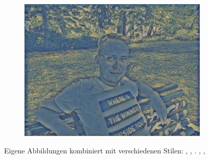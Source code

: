 \begin{figure}[H]
\begin{subfigure}[h]{0.13\textwidth}
        \includegraphics[width=\textwidth]{resources/content/experiments/ich-vgg16_the_olive_trees.jpg}
    \end{subfigure}

    \caption{Eigene Abbildungen kombiniert mit verschiedenen Stilen: \cite{crystal_glass_on_a_colorful_background_img}, \cite{portrait_of_joseph_roulin_img}, \cite{teal_and_black_abstract_painting_img}. \cite{multicolored_abstract_artwork_img}, \cite{still_life_with_liqueur_bottle_img}, \cite{the_olive_trees_img}}
\end{figure}